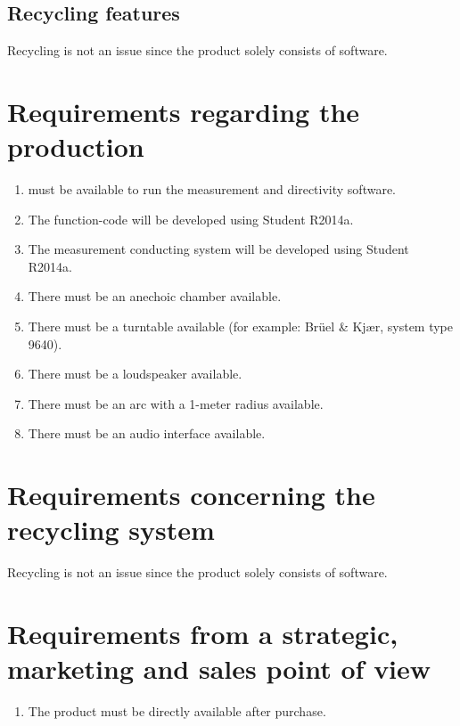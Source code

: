\subsection{Recycling features}
Recycling is not an issue since the product solely consists of software. 

\section{Requirements regarding the production}
\begin{enumerate}
\item {\matlab} must be available to run the measurement and directivity software. 
\item The function-code will be developed using {\matlab} Student R2014a. 
\item The measurement conducting system will be developed using {\matlab} Student R2014a. 
\item There must be an anechoic chamber available. 
\item There must be a turntable available (for example: Br\"uel \& Kj\ae r, system type 9640).
\item There must be a loudspeaker available.
\item There must be an arc with a 1-meter radius available.
\item There must be an audio interface available.
\end{enumerate}

\section{Requirements concerning the recycling system}
Recycling is not an issue since the product solely consists of software. 

\section{Requirements from a strategic, marketing and sales point of view}
\begin{enumerate}
\item The product must be directly available after purchase. 
\end{enumerate}